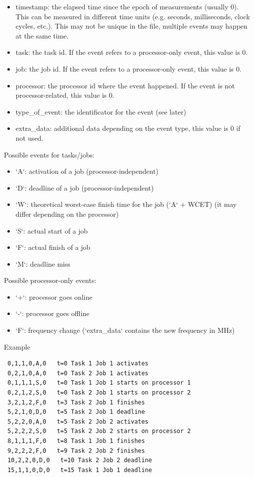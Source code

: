 \begin{itemize}
    \item timestamp: the elapsed time since the epoch of measurements (usually 0). 
This can be measured in different time units (e.g. seconds,
milliseconds, clock cycles, etc.). This may not be unique in
the file, multiple events may happen at the same time.
    \item  task: the task id. If the event refers to a processor-only event, this value is 0.
    \item job: the job id. If the event refers to a processor-only event, this value is 0.
    \item processor: the processor id where the event happened. If the event is not processor-related, this value is 0.
    \item type\_of\_event: the identificator for the event (see later)
    \item extra\_data: additional data depending on the event type, this value is 0 if not used.
\end{itemize}
Possible events for tasks/jobs:
\begin{itemize}
	\item `A`: activation of a job (processor-independent)
	\item`D`: deadline of a job (processor-independent)
	\item `W`: theoretical worst-case finish time for the job (`A` + WCET) (it may differ depending on the processor)
	\item`S`: actual start of a job
	\item `F`: actual finish of a job
	\item `M`: deadline miss
\end{itemize}
Possible processor-only events:
\begin{itemize}
 	\item `+`: processor goes online
 	\item `-`: processor goes offline
	\item `F`: frequency change (`extra\_data` contains the new frequency in MHz)
\end{itemize}
Example
\begin{verbatim}
 0,1,1,0,A,0   t=0 Task 1 Job 1 activates
 0,2,1,0,A,0   t=0 Task 2 Job 1 activates
 0,1,1,1,S,0   t=0 Task 1 Job 1 starts on processor 1
 0,2,1,2,S,0   t=0 Task 2 Job 1 starts on processor 2
 3,2,1,2,F,0   t=3 Task 2 Job 1 finishes
 5,2,1,0,D,0   t=5 Task 2 Job 1 deadline
 5,2,2,0,A,0   t=5 Task 2 Job 2 activates
 5,2,2,2,S,0   t=5 Task 2 Job 2 starts on processor 2
 8,1,1,1,F,0   t=8 Task 1 Job 1 finishes
 9,2,2,2,F,0   t=9 Task 2 Job 2 finishes
 10,2,2,0,D,0   t=10 Task 2 Job 2 deadline
 15,1,1,0,D,0   t=15 Task 1 Job 1 deadline
\end{verbatim}

